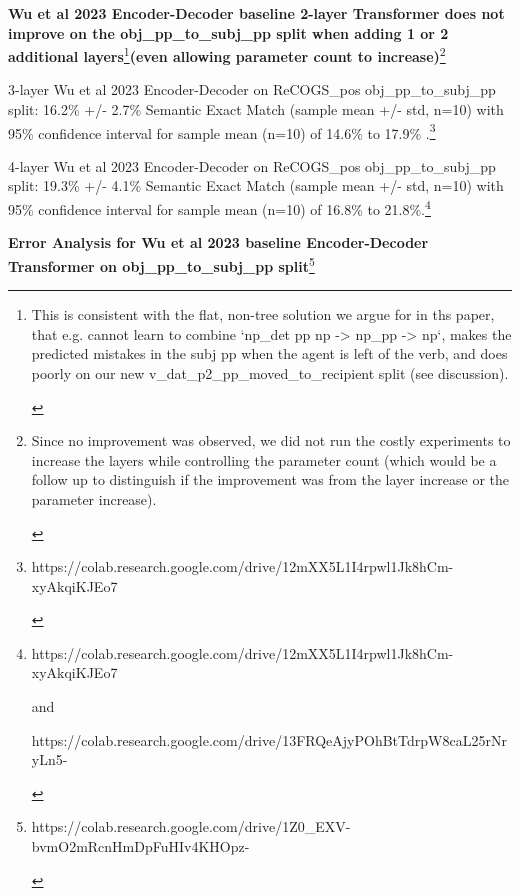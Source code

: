 \documentclass[11pt]{article}
\begin{document}
\textbf{Wu et al 2023 Encoder-Decoder baseline 2-layer Transformer does not improve on the obj\_pp\_to\_subj\_pp split when adding 1 or 2 additional layers}\footnote{
\begin{tiny}
This is consistent with the flat, non-tree solution we argue for in ths paper, that e.g. cannot learn to combine `np\_det pp np -> np\_pp -> np`, makes the predicted mistakes in the subj pp when the agent is left of the verb, and does poorly on our new v\_dat\_p2\_pp\_moved\_to\_recipient split  (see discussion).
\end{tiny}
}\textbf{(even allowing parameter count to increase)}\footnote{
\begin{tiny}
Since no improvement was observed, we did not run the costly experiments to increase the layers while controlling the parameter count (which would be a follow up to distinguish if the improvement was from the layer increase or the parameter increase).
\end{tiny}
}

3-layer Wu et al 2023 Encoder-Decoder on ReCOGS\_pos obj\_pp\_to\_subj\_pp split: 16.2\% +/- 2.7\% Semantic Exact Match (sample mean +/- std, n=10) with 95\% confidence interval for sample mean (n=10) of 14.6\% to 17.9\% .\footnote{ 
\begin{tiny}
https://colab.research.google.com/drive/12mXX5L1I4rpwl1Jk8hCm-xyAkqiKJEo7 
\end{tiny}
}

4-layer Wu et al 2023 Encoder-Decoder on ReCOGS\_pos obj\_pp\_to\_subj\_pp split: 19.3\% +/- 4.1\% Semantic Exact Match (sample mean +/- std, n=10) with 95\% confidence interval for sample mean (n=10) of 16.8\% to 21.8\%.\footnote{ 
\begin{tiny}
https://colab.research.google.com/drive/12mXX5L1I4rpwl1Jk8hCm-xyAkqiKJEo7 

and 

https://colab.research.google.com/drive/13FRQeAjyPOhBtTdrpW8caL25rNryLn5- 
\end{tiny}}

\textbf{Error Analysis for Wu et al 2023 baseline Encoder-Decoder Transformer on obj\_pp\_to\_subj\_pp split}\footnote{
\begin{tiny}
https://colab.research.google.com/drive/1Z0\_EXV-bvmO2mRcnHmDpFuHIv4KHOpz-
\end{tiny}
}

\end{document}
